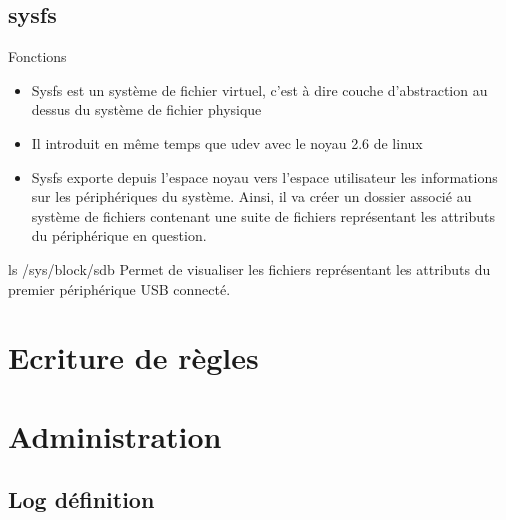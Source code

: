 \documentclass{beamer}
\begin{document}
\subsection{sysfs}

\begin{frame}
\begin{block}{Fonctions} 
	\begin{itemize}
		[circle]
		\item Sysfs est un système de fichier virtuel, c'est à dire couche d'abstraction au dessus du système de fichier physique
		\item Il introduit en même temps que udev avec le noyau 2.6 de linux 
		\item Sysfs exporte depuis l'espace noyau vers l'espace utilisateur les informations 
		sur les périphériques du système. Ainsi, il va créer un dossier associé au système de fichiers contenant une 
		suite de fichiers représentant les attributs du périphérique en question. 
	\end{itemize}
\end{block}

\begin{exampleblock}{ls /sys/block/sdb} 
	Permet de visualiser les fichiers représentant les attributs du premier périphérique USB connecté.
\end{exampleblock}
\end{frame}

\section{Ecriture de règles}

\section{Administration}

\subsection{Log définition}
\end{document}
